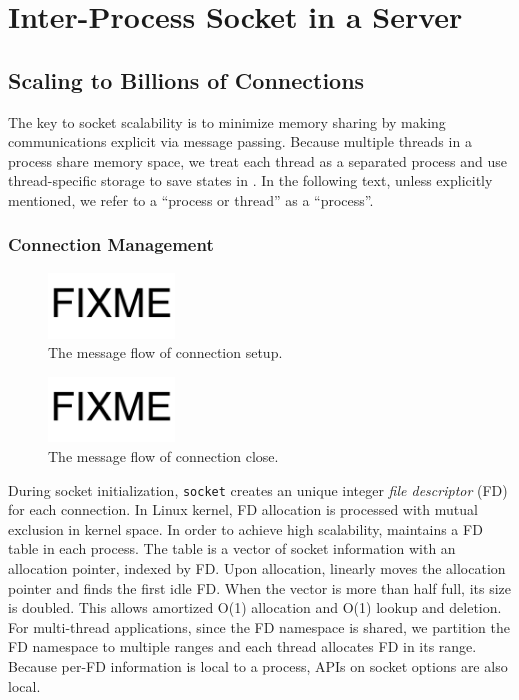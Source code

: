 \section{Inter-Process Socket in a Server}
\label{sec:intra-server}

\subsection{Scaling to Billions of Connections}
\label{subsec:socket-api}

The key to socket scalability is to minimize memory sharing by making communications explicit via message passing. Because multiple threads in a process share memory space, we treat each thread as a separated process and use thread-specific storage to save states in \libipc. In the following text, unless explicitly mentioned, we refer to a ``process or thread'' as a ``process''.


\subsubsection{Connection Management}
\label{subsubsec:connection_management}

\begin{figure}[t]
	\centering
	\includegraphics[width=0.3\textwidth]{images/fixme}
	\caption{The message flow of connection setup.}
	\label{fig:conn-setup}
\end{figure}

\begin{figure}[t]
	\centering
	\includegraphics[width=0.3\textwidth]{images/fixme}
	\caption{The message flow of connection close.}
	\label{fig:conn-close}
\end{figure}

During socket initialization, \texttt{socket} creates an unique integer \textit{file descriptor} (FD) for each connection. In Linux kernel, FD allocation is processed with mutual exclusion in kernel space. In order to achieve high scalability, \libipc{} maintains a FD table in each process. The table is a vector of socket information with an allocation pointer, indexed by FD. Upon allocation, \libipc{} linearly moves the allocation pointer and finds the first idle FD. When the vector is more than half full, its size is doubled. This allows amortized O(1) allocation and O(1) lookup and deletion. 
For multi-thread applications, since the FD namespace is shared, we partition the FD namespace to multiple ranges and each thread allocates FD in its range.
Because per-FD information is local to a process, APIs on socket options are also local.

